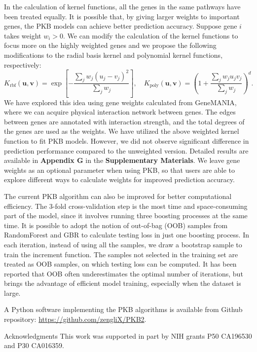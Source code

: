 \documentclass[a4paper,12pt]{article}
\newcommand{\bd}[1]{\mathbf{#1}}
\begin{document}
In the calculation of kernel functions, all the genes in the same pathways have been treated equally. It is possible that, by giving larger weights to important genes, the PKB models can achieve better prediction accuracy. Suppose gene $i$ takes weight $w_i > 0$. We can modify the calculation of the kernel functions to focus more on the highly weighted genes and we propose the following modifications to the radial basis kernel and polynomial kernel functions, respectively:
$$ K_{\text{rbf}}(\bd{u}, \bd{v})  =  \exp \left[ - \frac{\sum_j w_j (u_j - v_j)^2}{\sum_j w_j}  \right], \quad
K_{\text{poly}}(\bd{u}, \bd{v})  =  \left( 1 + \frac{ \sum_j w_j u_j v_j }{ \sum_j w_j } \right)^d.$$
We have explored this idea using gene weights calculated from GeneMANIA, \citep{warde2010genemania} where we can acquire physical interaction network between genes. The edges between genes are annotated with interaction strength, and the total degrees of the genes are used as the weights. We have utilized the above weighted kernel function to fit PKB models. However, we did not observe significant difference in prediction performance compared to the unweighted version. Detailed results are available in \textbf{Appendix G} in the \textbf{Supplementary Materials}. We leave gene weights as an optional parameter when using PKB, so that users are able to explore different ways to calculate weights for improved prediction accuracy.

The current PKB algorithm can also be improved for better computational efficiency. The 3-fold cross-validation step is the most time and space-consuming part of the model, since it involves running three boosting processes at the same time. It is possible to adopt the notion of out-of-bag (OOB) samples from RandomForest and GBR to calculate testing loss in just one boosting process. In each iteration, instead of using all the samples, we draw a bootstrap sample to train the increment function. The samples not selected in the training set are treated as OOB samples, on which testing loss can be computed. It has been reported that OOB often underestimates the optimal number of iterations, \citep{ridgeway2006gbm} but brings the advantage of efficient model training, especially when the dataset is large.

A Python software implementing the PKB algorithms is available from Github repository: \href{https://github.com/zengliX/PKB}{https://github.com/zengliX/PKB2}. 


Acknowledgments
This work was supported in part by NIH grants P50 CA196530 and P30 CA016359.
\end{document}
